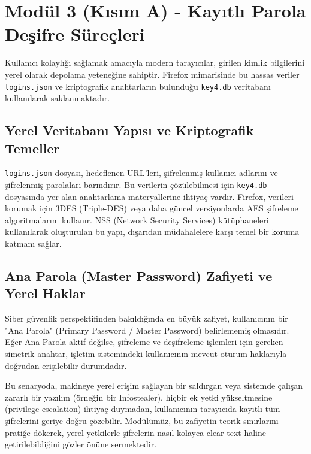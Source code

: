 \documentclass[12pt,a4paper]{article}
\begin{document}
\section{Modül 3 (Kısım A) - Kayıtlı Parola Deşifre Süreçleri}

Kullanıcı kolaylığı sağlamak amacıyla modern tarayıcılar, girilen kimlik bilgilerini yerel olarak depolama yeteneğine sahiptir. Firefox mimarisinde bu hassas veriler \texttt{logins.json} ve kriptografik anahtarların bulunduğu \texttt{key4.db} veritabanı kullanılarak saklanmaktadır.

\subsection{Yerel Veritabanı Yapısı ve Kriptografik Temeller}
\texttt{logins.json} dosyası, hedeflenen URL'leri, şifrelenmiş kullanıcı adlarını ve şifrelenmiş parolaları barındırır. Bu verilerin çözülebilmesi için \texttt{key4.db} dosyasında yer alan anahtarlama materyallerine ihtiyaç vardır. Firefox, verileri korumak için 3DES (Triple-DES) veya daha güncel versiyonlarda AES şifreleme algoritmalarını kullanır. NSS (Network Security Services) kütüphaneleri kullanılarak oluşturulan bu yapı, dışarıdan müdahalelere karşı temel bir koruma katmanı sağlar.

\subsection{Ana Parola (Master Password) Zafiyeti ve Yerel Haklar}
Siber güvenlik perspektifinden bakıldığında en büyük zafiyet, kullanıcının bir "Ana Parola" (Primary Password / Master Password) belirlememiş olmasıdır. Eğer Ana Parola aktif değilse, şifreleme ve deşifreleme işlemleri için gereken simetrik anahtar, işletim sistemindeki kullanıcının mevcut oturum haklarıyla doğrudan erişilebilir durumdadır. 

Bu senaryoda, makineye yerel erişim sağlayan bir saldırgan veya sistemde çalışan zararlı bir yazılım (örneğin bir Infostealer), hiçbir ek yetki yükseltmesine (privilege escalation) ihtiyaç duymadan, kullanıcının tarayıcıda kayıtlı tüm şifrelerini geriye doğru çözebilir. Modülümüz, bu zafiyetin teorik sınırlarını pratiğe dökerek, yerel yetkilerle şifrelerin nasıl kolayca clear-text haline getirilebildiğini gözler önüne sermektedir.
\clearpage

\end{document}
